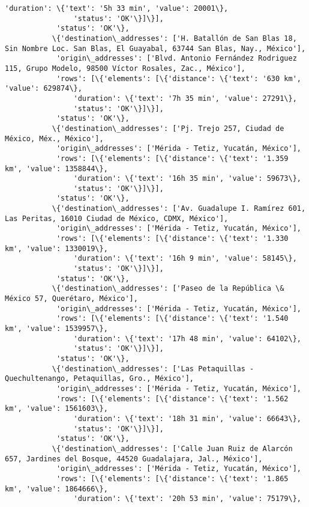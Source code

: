 \documentclass[11pt]{article}
\begin{document}
\begin{Verbatim}[commandchars=\\\{\}]
                'duration': \{'text': '5h 33 min', 'value': 20001\},
                'status': 'OK'\}]\}],
            'status': 'OK'\},
           \{'destination\_addresses': ['H. Batallón de San Blas 18, Sin Nombre Loc. San Blas, El Guayabal, 63744 San Blas, Nay., México'],
            'origin\_addresses': ['Blvd. Antonio Fernández Rodriguez 115, Grupo Modelo, 98500 Víctor Rosales, Zac., México'],
            'rows': [\{'elements': [\{'distance': \{'text': '630 km', 'value': 629874\},
                'duration': \{'text': '7h 35 min', 'value': 27291\},
                'status': 'OK'\}]\}],
            'status': 'OK'\},
           \{'destination\_addresses': ['Pj. Trejo 257, Ciudad de México, Méx., México'],
            'origin\_addresses': ['Mérida - Tetiz, Yucatán, México'],
            'rows': [\{'elements': [\{'distance': \{'text': '1.359 km', 'value': 1358844\},
                'duration': \{'text': '16h 35 min', 'value': 59673\},
                'status': 'OK'\}]\}],
            'status': 'OK'\},
           \{'destination\_addresses': ['Av. Guadalupe I. Ramírez 601, Las Peritas, 16010 Ciudad de México, CDMX, México'],
            'origin\_addresses': ['Mérida - Tetiz, Yucatán, México'],
            'rows': [\{'elements': [\{'distance': \{'text': '1.330 km', 'value': 1330019\},
                'duration': \{'text': '16h 9 min', 'value': 58145\},
                'status': 'OK'\}]\}],
            'status': 'OK'\},
           \{'destination\_addresses': ['Paseo de la República \& México 57, Querétaro, México'],
            'origin\_addresses': ['Mérida - Tetiz, Yucatán, México'],
            'rows': [\{'elements': [\{'distance': \{'text': '1.540 km', 'value': 1539957\},
                'duration': \{'text': '17h 48 min', 'value': 64102\},
                'status': 'OK'\}]\}],
            'status': 'OK'\},
           \{'destination\_addresses': ['Las Petaquillas - Quechultenango, Petaquillas, Gro., México'],
            'origin\_addresses': ['Mérida - Tetiz, Yucatán, México'],
            'rows': [\{'elements': [\{'distance': \{'text': '1.562 km', 'value': 1561603\},
                'duration': \{'text': '18h 31 min', 'value': 66643\},
                'status': 'OK'\}]\}],
            'status': 'OK'\},
           \{'destination\_addresses': ['Calle Juan Ruiz de Alarcón 657, Jardines del Bosque, 44520 Guadalajara, Jal., México'],
            'origin\_addresses': ['Mérida - Tetiz, Yucatán, México'],
            'rows': [\{'elements': [\{'distance': \{'text': '1.865 km', 'value': 1864666\},
                'duration': \{'text': '20h 53 min', 'value': 75179\},

\end{Verbatim}
\end{document}
